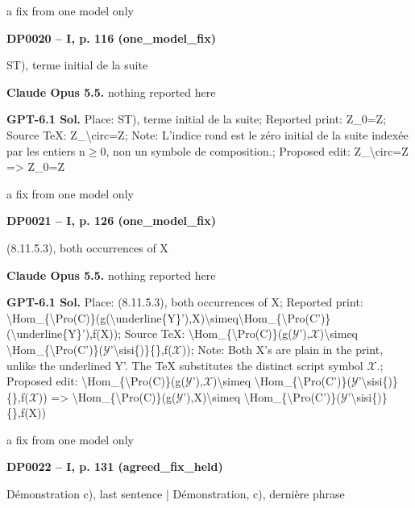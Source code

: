 a fix from one model only\par
\par\noindent\hypertarget{DP0020}{}\textbf{DP0020 -- I, p. 116 (one\_model\_fix)}\par
ST), terme initial de la suite\par
\textbf{Claude Opus 5.5.} nothing reported here\par
\textbf{GPT-6.1 Sol.} Place: ST), terme initial de la suite; Reported print: Z\_0=\allowbreak Z; Source TeX: Z\_\textbackslash{}circ=\allowbreak Z; Note: L'indice rond est le zéro initial de la suite indexée par les entiers n\ensuremath{\geq}0, non un symbole de composition.; Proposed edit: Z\_\textbackslash{}circ=\allowbreak Z =\allowbreak > Z\_0=\allowbreak Z\par
a fix from one model only\par
\par\noindent\hypertarget{DP0021}{}\textbf{DP0021 -- I, p. 126 (one\_model\_fix)}\par
(8.11.5.3), both occurrences of X\par
\textbf{Claude Opus 5.5.} nothing reported here\par
\textbf{GPT-6.1 Sol.} Place: (8.11.5.3), both occurrences of X; Reported print: \textbackslash{}Hom\_\{\textbackslash{}Pro(C)\}(g(\textbackslash{}underline\{Y\}'),X)\textbackslash{}simeq\textbackslash{}Hom\_\{\textbackslash{}Pro(C')\}(\textbackslash{}underline\{Y\}'),f(X)); Source TeX: \textbackslash{}Hom\_\{\textbackslash{}Pro(C)\}(g(\ensuremath{𝒴}'),\ensuremath{𝒳})\textbackslash{}simeq \textbackslash{}Hom\_\{\textbackslash{}Pro(C')\}(\ensuremath{𝒴}'\textbackslash{}sisi\{)\}\{\},f(\ensuremath{𝒳})); Note: Both X's are plain in the print, unlike the underlined Y'. The TeX substitutes the distinct script symbol \ensuremath{𝒳}.; Proposed edit: \textbackslash{}Hom\_\{\textbackslash{}Pro(C)\}(g(\ensuremath{𝒴}'),\ensuremath{𝒳})\textbackslash{}simeq \textbackslash{}Hom\_\{\textbackslash{}Pro(C')\}(\ensuremath{𝒴}'\textbackslash{}sisi\{)\}\{\},f(\ensuremath{𝒳})) =\allowbreak > \textbackslash{}Hom\_\{\textbackslash{}Pro(C)\}(g(\ensuremath{𝒴}'),X)\textbackslash{}simeq \textbackslash{}Hom\_\{\textbackslash{}Pro(C')\}(\ensuremath{𝒴}'\textbackslash{}sisi\{)\}\{\},f(X))\par
a fix from one model only\par
\par\noindent\hypertarget{DP0022}{}\textbf{DP0022 -- I, p. 131 (agreed\_fix\_held)}\par
Démonstration c), last sentence | Démonstration, c), dernière phrase\par
